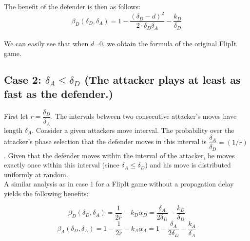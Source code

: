  
 The benefit of the defender is then as follows:
\begin{equation*}
\beta_{D}(\delta_{D},\delta_{A}) = 1 - \dfrac { (\delta_{D}-d) ^{2}} {2 \cdot \delta_{D}  \delta_{A}} - \dfrac{k_{D}}{ \delta_{D}}
\end{equation*}
~~\\
We can easily see that when $d$=0, we obtain the formula of the original FlipIt game.\\





\subsection*{\textbf{Case 2:} $\delta_{A} \leq \delta_{D} $ (The attacker plays at least as fast as the defender.) }

First let $r = \dfrac{\delta_{D}}{ \delta_{A} }$. The intervals between two consecutive attacker's moves have length $\delta_{A}$. Consider a given attackers move interval. The probability over the attacker's phase selection that the defender moves in this interval is $\dfrac{\delta_{A}}{ \delta_{D} } = (1/r)$. Given that the defender moves within the interval of the attacker, he moves exactly once within this interval (since $\delta_{A} \leq \delta_{D} $) and his move is distributed uniformly at random. \\

A similar analysis as in case 1 for a FlipIt game without a propagation delay yields the following benefits:

\begin{equation*}
\beta_{D}(\delta_{D},\delta_{A}) = \dfrac {1} {2r} - k_{D} \alpha_{D} = \dfrac {\delta_{A}} {2\delta_{D}} - \dfrac{k_{D} }{\delta_{D}} 
\end{equation*}
\begin{equation*}
\beta_{A}(\delta_{D},\delta_{A}) =1 - \dfrac {1} {2r} - k_{A} \alpha_{A} = 1- \dfrac {\delta_{A}} {2\delta_{D}} - \dfrac{k_{A}}{ \delta_{A}}  
\end{equation*}\\

